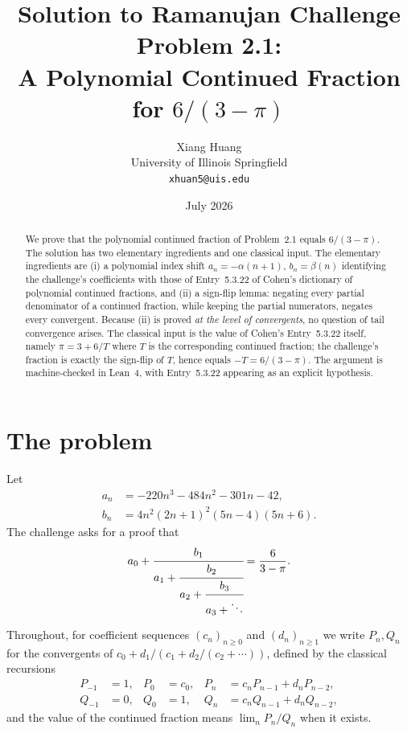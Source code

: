 \documentclass[11pt]{article}
\title{Solution to Ramanujan Challenge Problem 2.1:\\
A Polynomial Continued Fraction for $6/(3-\pi)$}
\author{Xiang Huang\\{\small University of Illinois Springfield}\\{\small\texttt{xhuan5@uis.edu}}}
\date{July 2026}
\theoremstyle{remark}
\begin{document}
\maketitle

\begin{abstract}
We prove that the polynomial continued fraction of Problem~2.1 equals
$6/(3-\pi)$. The solution has two elementary ingredients and one classical
input. The elementary ingredients are (i) a polynomial index shift
$a_n = -\alpha(n+1)$, $b_n = \beta(n)$ identifying the challenge's coefficients
with those of Entry~5.3.22 of Cohen's dictionary of polynomial continued
fractions, and (ii) a sign-flip lemma: negating every partial denominator of a
continued fraction, while keeping the partial numerators, negates every
convergent. Because (ii) is proved \emph{at the level of convergents}, no
question of tail convergence arises. The classical input is the value of Cohen's
Entry~5.3.22 itself, namely $\pi = 3 + 6/T$ where $T$ is the corresponding
continued fraction; the challenge's fraction is exactly the sign-flip of $T$,
hence equals $-T = 6/(3-\pi)$. The argument is machine-checked in Lean~4, with
Entry~5.3.22 appearing as an explicit hypothesis.
\end{abstract}

\section{The problem}

Let
\begin{align}
a_n &= -220n^3 - 484n^2 - 301n - 42, \label{eq:an}\\
b_n &= 4n^2(2n+1)^2(5n-4)(5n+6). \label{eq:bn}
\end{align}
The challenge asks for a proof that
\begin{equation}\label{eq:main}
a_0 + \cfrac{b_1}{a_1 + \cfrac{b_2}{a_2 + \cfrac{b_3}{a_3 + \ddots}}}
= \frac{6}{3-\pi}.
\end{equation}

Throughout, for coefficient sequences $(c_n)_{n\ge0}$ and $(d_n)_{n\ge1}$ we
write $P_n,Q_n$ for the convergents of $c_0 + d_1/(c_1 + d_2/(c_2+\cdots))$,
defined by the classical recursions
\begin{equation}\label{eq:conv}
\begin{aligned}
P_{-1} &= 1, & P_0 &= c_0, & P_n &= c_nP_{n-1} + d_nP_{n-2},\\
Q_{-1} &= 0, & Q_0 &= 1,   & Q_n &= c_nQ_{n-1} + d_nQ_{n-2},
\end{aligned}
\end{equation}
and the value of the continued fraction means $\lim_n P_n/Q_n$ when it exists.
\end{document}
